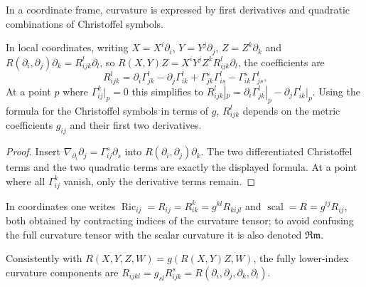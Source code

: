 In a coordinate frame, curvature is expressed by first derivatives and
quadratic combinations of Christoffel symbols.

\begin{proposition}
  \label{prop:pet-ch3-curvature-coordinate-formula}
  \leanok
  In local coordinates, writing $X=X^i\partial_i$, $Y=Y^j\partial_j$,
  $Z=Z^k\partial_k$ and $R(\partial_i,\partial_j)\partial_k=R^l_{ijk}\partial_l$, so
  $R(X,Y)Z=X^iY^jZ^kR^l_{ijk}\partial_l$, the coefficients are
  \[
    R^l_{ijk}=\partial_i\Gamma^l_{jk}-\partial_j\Gamma^l_{ik}
    +\Gamma^s_{jk}\Gamma^l_{is}-\Gamma^s_{ik}\Gamma^l_{js}.
  \]
  At a point $p$ where $\Gamma^k_{ij}|_p=0$ this simplifies to
  $R^l_{ijk}|_p=\partial_i\Gamma^l_{jk}|_p-\partial_j\Gamma^l_{ik}|_p$. Using the
  formula for the Christoffel symbols in terms of $g$, $R^l_{ijk}$ depends on the
  metric coefficients $g_{ij}$ and their first two derivatives.
\end{proposition}
\begin{proof}
  \leanok
  \sketch
  Insert
  $\nabla_{\partial_i}\partial_j=\Gamma^s_{ij}\partial_s$ into
  $R(\partial_i,\partial_j)\partial_k$. The two differentiated Christoffel terms
  and the two quadratic terms are exactly the displayed formula. At a point
  where all $\Gamma^k_{ij}$ vanish, only the derivative terms remain.
\end{proof}

\begin{remark}
  \label{rem:pet-ch3-ricci-scalar-index-notation}
  \leanok
  In coordinates one writes $\operatorname{Ric}_{ij}=R_{ij}=R^k_{ik}=g^{kl}R_{kijl}$ and
  $\operatorname{scal}=R=g^{ij}R_{ij}$, both obtained by contracting indices of the curvature
  tensor; to avoid confusing the full curvature tensor with the scalar curvature
  it is also denoted $\mathfrak{Rm}$.
\end{remark}

\begin{remark}
  \label{rem:pet-ch3-curvature-index-conventions}
  \leanok
  Consistently with $R(X,Y,Z,W)=g(R(X,Y)Z,W)$, the fully lower-index curvature
  components are $R_{ijkl}=g_{sl}R^s_{ijk}=R(\partial_i,\partial_j,\partial_k,\partial_l)$.
\end{remark}

